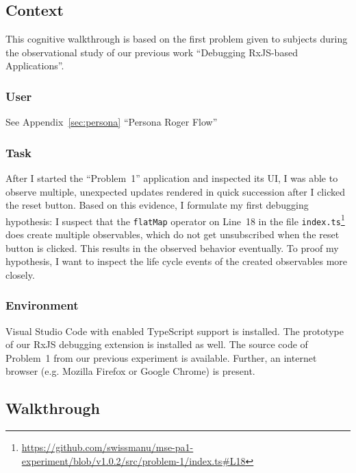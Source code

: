 \documentclass[sigplan,screen,nonacm,review]{acmart}
\begin{document}
\subsection{Context}

This cognitive walkthrough is based on the first problem given to subjects during the observational study of our previous work ``Debugging RxJS-based Applications''\cite{TODO}.

\subsubsection{User}
See Appendix~\ref{sec:persona} ``Persona Roger Flow''

\subsubsection{Task}

After I started the ``Problem~1'' application and inspected its UI, I was able to observe multiple, unexpected updates rendered in quick succession after I clicked the reset button. Based on this evidence, I formulate my first debugging hypothesis: I suspect that the \texttt{flatMap} operator on Line~18 in the file \texttt{index.ts}\footnote{\url{https://github.com/swissmanu/mse-pa1-experiment/blob/v1.0.2/src/problem-1/index.ts\#L18}} does create multiple observables, which do not get unsubscribed when the reset button is clicked. This results in the observed behavior eventually. To proof my hypothesis, I want to inspect the life cycle events of the created observables more closely.

\subsubsection{Environment}

Visual Studio Code with enabled TypeScript support is installed. The prototype of our RxJS debugging extension is installed as well. The source code of Problem~1 from our previous experiment is available. Further, an internet browser (e.g. Mozilla Firefox or Google Chrome) is present.

\subsection{Walkthrough}

\end{document}
